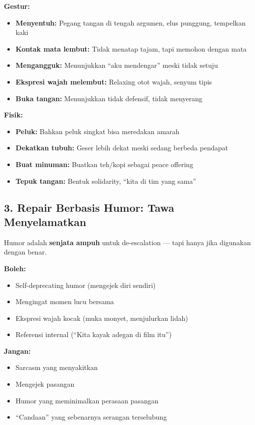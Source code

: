 \begin{praktikbox}
\textbf{Gestur:}
\begin{itemize}
    \item \textbf{Menyentuh:} Pegang tangan di tengah argumen, elus punggung, tempelkan kaki
    \item \textbf{Kontak mata lembut:} Tidak menatap tajam, tapi memohon dengan mata
    \item \textbf{Mengangguk:} Menunjukkan ``aku mendengar'' meski tidak setuju
    \item \textbf{Ekspresi wajah melembut:} Relaxing otot wajah, senyum tipis
    \item \textbf{Buka tangan:} Menunjukkan tidak defensif, tidak menyerang
\end{itemize}

\textbf{Fisik:}
\begin{itemize}
    \item \textbf{Peluk:} Bahkan peluk singkat bisa meredakan amarah
    \item \textbf{Dekatkan tubuh:} Geser lebih dekat meski sedang berbeda pendapat
    \item \textbf{Buat minuman:} Buatkan teh/kopi sebagai peace offering
    \item \textbf{Tepuk tangan:} Bentuk solidarity, ``kita di tim yang sama''
\end{itemize}
\end{praktikbox}

\subsection{3. Repair Berbasis Humor: Tawa Menyelamatkan}

Humor adalah \textbf{senjata ampuh} untuk de-escalation --- tapi hanya jika digunakan dengan benar.

\begin{warningbox}
\textbf{\textcolor{sagegreen}{Boleh:}}
\begin{itemize}
    \item Self-deprecating humor (mengejek diri sendiri)
    \item Mengingat momen lucu bersama
    \item Ekspresi wajah kocak (muka monyet, menjulurkan lidah)
    \item Referensi internal (``Kita kayak adegan di film itu'')
\end{itemize}

\textbf{\textcolor{accent}{Jangan:}}
\begin{itemize}
    \item Sarcasm yang menyakitkan
    \item Mengejek pasangan
    \item Humor yang meminimalkan perasaan pasangan
    \item ``Candaan'' yang sebenarnya serangan terselubung
\end{itemize}
\end{warningbox}

